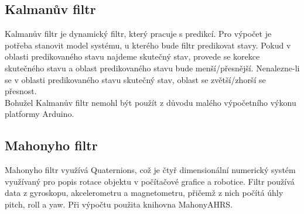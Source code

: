 \subsection{Kalmanův filtr}
Kalmanův filtr je dynamický filtr, který pracuje s predikcí. Pro výpočet je potřeba stanovit model systému, u kterého bude filtr predikovat stavy. Pokud v oblasti predikovaného stavu najdeme skutečný stav, provede se korekce skutečného stavu a oblast predikovaného stavu bude menší/přesnější. Nenalezne-li se v oblasti predikovaného stavu skutečný stav, oblast se zvětší/zhorší se přesnost.\\
Bohužel Kalmanův filtr nemohl být použít z důvodu malého výpočetního výkonu platformy Arduino.

\subsection{Mahonyho filtr}
Mahonyho filtr využívá Quaternions, což je čtyř dimensionální numerický systém využívaný pro popis rotace objektu v počítačové grafice a robotice. Filtr používá data z gyroskopu, akcelerometru a magnetometru, přičemž z nich počítá úhly pitch, roll a yaw. Při výpočtu použita knihovna MahonyAHRS. \cite{mahony}\\

